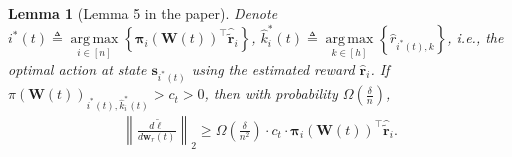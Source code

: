 \documentclass[10pt]{article}
\def\rvs{{\mathbf{s}}}
\def\rvw{{\mathbf{w}}}
\def\rvtilder{{\tilde{\mathbf{r}}}}
\def\rvhat{{\hat{\mathbf{r}}}}
\newtheorem{lem}{Lemma}
\def\rvpi{{\boldsymbol{\pi}}}
\def\rmW{{\mathbf{W}}}
\DeclareMathOperator*{\argmax}{arg\,max}
\begin{document}
\begin{lem}[Lemma 5 in the paper]
\label{lem:gradient_lower_bound}
	Denote $i^*(t) \triangleq \argmax\limits_{i \in [n]}\left\{\rvpi_i\left( \rmW(t)\right)^\top \hat{\rvtilder}_i\right\}$, $\hat{k}_i^*(t) \triangleq \argmax\limits_{k \in [h]}\left\{ \hat{r}_{i^*(t),k} \right\}$, i.e., the optimal action at state $\rvs_{i^*(t)}$ using the estimated reward $\rvhat_i$. If $\pi\left(\rmW(t)\right)_{i^*(t), \hat{k}_i^*(t)} > c_t > 0$, then with probability $\Omega\left( \frac{\delta}{n} \right)$,
\begin{equation*}
\begin{split}
	\left\| \frac{d\tilde{\ell}}{d \rvw_r(t)} \right\|_2 \ge \Omega\left( \frac{\delta}{n^2} \right) \cdot c_t \cdot \rvpi_i\left( \rmW(t) \right)^\top \hat{\rvtilder}_{i}.
\end{split}
\end{equation*}
\end{lem}
\end{document}
